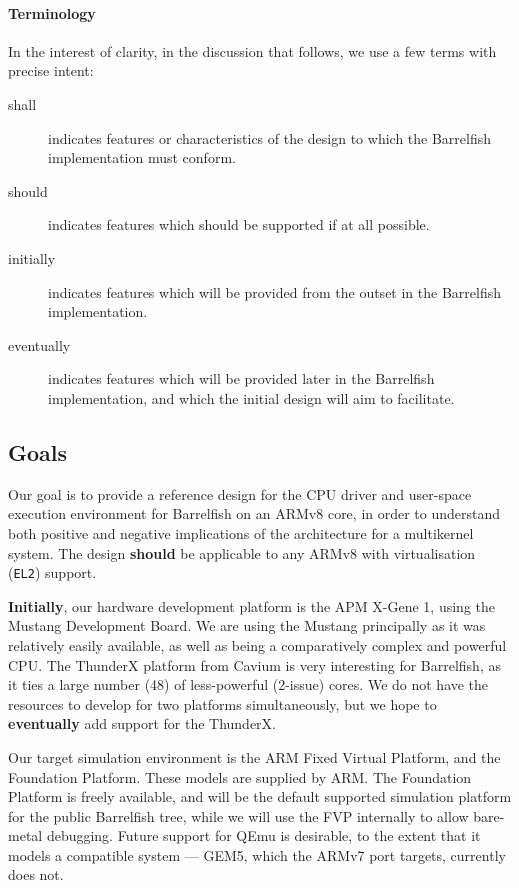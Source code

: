 \documentclass[a4paper,twoside]{report}
\begin{document}
\paragraph{Terminology}
In the interest of clarity, in the discussion that follows, we use a few terms
with precise intent:
\begin{description}
\item[shall]
    indicates features or characteristics of the design to which the
    Barrelfish implementation must conform.
\item[should]
    indicates features which should be supported if at all possible.
\item[initially]
    indicates features which will be provided from the outset in the
    Barrelfish implementation.
\item[eventually]
    indicates features which will be provided later in the Barrelfish
    implementation, and which the initial design will aim to facilitate.
\end{description}

\subsection{Goals}

Our goal is to provide a reference design for the CPU driver and user-space
execution environment for Barrelfish on an ARMv8 core, in order to understand
both positive and negative implications of the architecture for a multikernel
system.  The design \textbf{should} be applicable to any ARMv8 with
virtualisation (\texttt{EL2}) support.

\textbf{Initially}, our hardware development platform is the APM X-Gene 1,
using the Mustang Development Board. We are using the Mustang principally as
it was relatively easily available, as well as being a comparatively complex
and powerful CPU. The ThunderX platform from Cavium is very interesting for
Barrelfish, as it ties a large number (48) of less-powerful (2-issue) cores.
We do not have the resources to develop for two platforms simultaneously, but
we hope to \textbf{eventually} add support for the ThunderX.

Our target simulation environment is the ARM Fixed Virtual Platform, and the
Foundation Platform. These models are supplied by ARM. The Foundation Platform
is freely available, and will be the default supported simulation platform for
the public Barrelfish tree, while we will use the FVP internally to allow
bare-metal debugging. Future support for QEmu is desirable, to the extent that
it models a compatible system --- GEM5, which the ARMv7 port targets,
currently does not.
\end{document}
